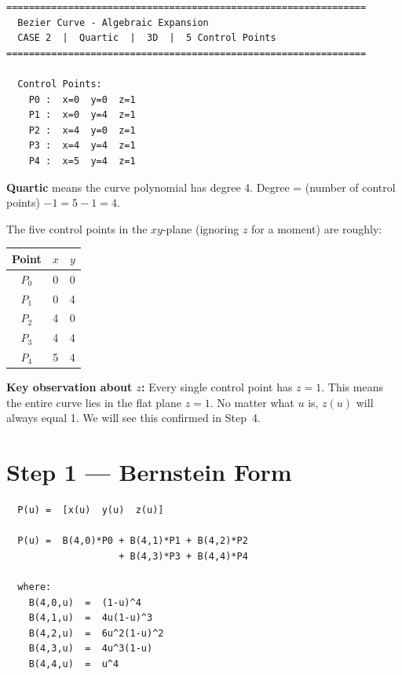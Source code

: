 \documentclass[12pt, a4paper]{article}
\begin{document}
\begin{verbatim}
================================================================
  Bezier Curve - Algebraic Expansion
  CASE 2  |  Quartic  |  3D  |  5 Control Points
================================================================

  Control Points:
    P0 :  x=0  y=0  z=1
    P1 :  x=0  y=4  z=1
    P2 :  x=4  y=0  z=1
    P3 :  x=4  y=4  z=1
    P4 :  x=5  y=4  z=1
\end{verbatim}

\textbf{Quartic} means the curve polynomial has degree 4.
Degree = (number of control points) $- 1 = 5 - 1 = 4$.

The five control points in the $xy$-plane (ignoring $z$ for a moment)
are roughly:

\medskip
\begin{center}
\begin{tabular}{ccc}
\toprule
Point & $x$ & $y$ \\
\midrule
$P_0$ & 0 & 0 \\
$P_1$ & 0 & 4 \\
$P_2$ & 4 & 0 \\
$P_3$ & 4 & 4 \\
$P_4$ & 5 & 4 \\
\bottomrule
\end{tabular}
\end{center}

\begin{notebox}
\textbf{Key observation about $z$:}
Every single control point has $z = 1$.
This means the entire curve lies in the flat plane $z = 1$.
No matter what $u$ is, $z(u)$ will always equal 1.
We will see this confirmed in Step~4.
\end{notebox}


\section{Step 1 --- Bernstein Form}

\begin{verbatim}
  P(u) =  [x(u)  y(u)  z(u)]

  P(u) =  B(4,0)*P0 + B(4,1)*P1 + B(4,2)*P2
                    + B(4,3)*P3 + B(4,4)*P4

  where:
    B(4,0,u)  =  (1-u)^4
    B(4,1,u)  =  4u(1-u)^3
    B(4,2,u)  =  6u^2(1-u)^2
    B(4,3,u)  =  4u^3(1-u)
    B(4,4,u)  =  u^4
\end{verbatim}
\end{document}
